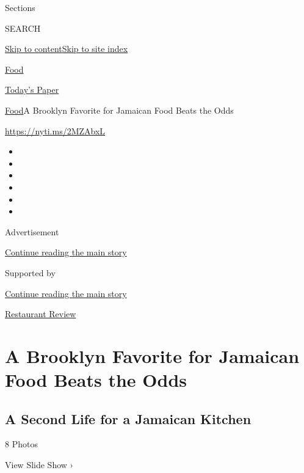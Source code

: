 Sections

SEARCH

\protect\hyperlink{site-content}{Skip to
content}\protect\hyperlink{site-index}{Skip to site index}

\href{https://www.nytimes3xbfgragh.onion/section/food}{Food}

\href{https://myaccount.nytimes3xbfgragh.onion/auth/login?response_type=cookie\&client_id=vi}{}

\href{https://www.nytimes3xbfgragh.onion/section/todayspaper}{Today's
Paper}

\href{/section/food}{Food}\textbar{}A Brooklyn Favorite for Jamaican
Food Beats the Odds

\url{https://nyti.ms/2MZAbxL}

\begin{itemize}
\item
\item
\item
\item
\item
\item
\end{itemize}

Advertisement

\protect\hyperlink{after-top}{Continue reading the main story}

Supported by

\protect\hyperlink{after-sponsor}{Continue reading the main story}

\href{/column/restaurant-review}{Restaurant Review}

\hypertarget{a-brooklyn-favorite-for-jamaican-food-beats-the-odds}{%
\section{A Brooklyn Favorite for Jamaican Food Beats the
Odds}\label{a-brooklyn-favorite-for-jamaican-food-beats-the-odds}}

\href{https://www.nytimes3xbfgragh.onion/slideshow/2018/06/26/dining/the-islands-restaurant-brooklyn.html}{}

\hypertarget{a-second-life-for-a-jamaican-kitchen}{%
\subsection{A Second Life for a Jamaican
Kitchen}\label{a-second-life-for-a-jamaican-kitchen}}

8 Photos

View Slide Show ›

